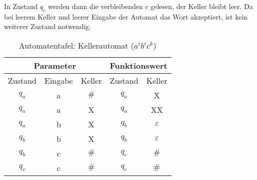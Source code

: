 In Zustand $q_c$ werden dann die verbleibenden $c$ gelesen, der Keller bleibt leer. Da bei leerem Keller und leerer Eingabe
der Automat das Wort akzeptiert, ist kein weiterer Zustand notwendig.

\begin{table}[h]
\centering
\begin{tabular}{|c|c|c||c|c|}
\hline
\multicolumn{3}{|c||}{Parameter} & \multicolumn{2}{c|}{Funktionswert} \\ \hline
Zustand   	& Eingabe   & Keller  		& Zustand          	& Keller          \\ \hline
$q_a$       & a         & $\#$			& $q_a$             & X               \\ \hline
$q_a$       & a         & X       		& $q_a$             & XX              \\ \hline
$q_a$       & b         & X       		& $q_b$     		& $\varepsilon$   \\ \hline
$q_b$       & b         & X       		& $q_b$     		& $\varepsilon$   \\ \hline
$q_b$       & c         & $\#$     		& $q_c$     		& $\#$			  \\ \hline
$q_c$       & c         & $\#$     		& $q_c$     		& $\#$			  \\ \hline
\end{tabular}
\caption{Automatentafel: Kellerautomat ($a^ib^ic^k$)}
\label{tbl:bspkeller}
\end{table}

